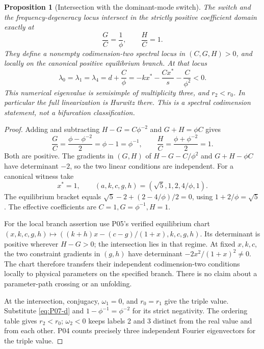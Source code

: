 \documentclass[11pt]{article}
\newtheorem{proposition}[theorem]{Proposition}
\theoremstyle{definition}
\theoremstyle{remark}
\begin{document}
\begin{proposition}[Intersection with the dominant-mode switch]
\label{prop:P07-intersection}
The switch and the frequency-degeneracy locus intersect in the strictly
positive coefficient domain exactly at
\begin{equation}
 \boxed{\frac GC=\frac1\phi,\qquad \frac HC=1.}
 \label{eq:P07-intersection}
\end{equation}
They define a nonempty codimension-two spectral locus in $(C,G,H)>0$,
and locally on the canonical positive equilibrium branch. At that locus
\begin{equation}
 \lambda_0=\lambda_1=\lambda_4=d+\frac C\phi
   =-kx^*-\frac{Cx^*}{s}-\frac{C}{\phi^2}<0.
 \label{eq:P07-triple}
\end{equation}
This numerical eigenvalue is semisimple of multiplicity three, and
$r_2<r_0$. In particular the full linearization is Hurwitz there.
This is a spectral codimension statement, not a bifurcation classification.
\end{proposition}
\begin{proof}
Adding and subtracting $H-G=C\phi^{-2}$ and $G+H=\phi C$ gives
\[
 \frac GC=\frac{\phi-\phi^{-2}}2=\phi-1=\phi^{-1},\qquad
 \frac HC=\frac{\phi+\phi^{-2}}2=1.
\]
Both are positive. The gradients in $(G,H)$ of
$H-G-C/\phi^2$ and $G+H-\phi C$ have determinant $-2$, so the
two linear conditions are independent. For a canonical witness take
\begin{equation}
 x^*=1,\qquad (a,k,c,g,h)=(\sqrt5,1,2,4/\phi,1).
 \label{eq:P07-intersection-witness}
\end{equation}
The equilibrium bracket equals $\sqrt5-2+(2-4/\phi)/2=0$,
using $1+2/\phi=\sqrt5$. The effective coefficients are
$C=1,G=\phi^{-1},H=1$.

For the local branch assertion use P05's verified equilibrium chart
$(x,k,c,g,h)\mapsto((k+h)x-(c-g)/(1+x),k,c,g,h)$.
Its determinant is positive wherever $H-G>0$; the intersection lies
in that regime. At fixed $x,k,c$, the two constraint gradients in
$(g,h)$ have determinant $-2x^2/(1+x)^2\ne0$.
The chart therefore transfers their independent codimension-two
conditions locally to physical parameters on the specified branch.
There is no claim about a parameter-path crossing or an unfolding.

At the intersection, conjugacy, $\omega_1=0$, and $r_0=r_1$
give the triple value. Substitute \eqref{eq:P07-d} and
$1-\phi^{-1}=\phi^{-2}$ for its strict negativity.
The ordering table gives $r_2<r_0$; $\omega_2<0$ keeps labels 2 and 3
distinct from the real value and from each other. P04 counts precisely
three independent Fourier eigenvectors for the triple value.
\end{proof}
\end{document}
